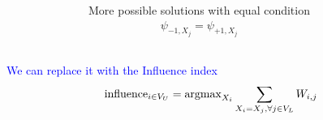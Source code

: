 \begin{frame}
\begin{columns}
\begin{figure}
		\end{figure}
		
		More possible solutions with equal condition
		\begin{align*}
		\psi_{-1, X_j} = \psi_{+1, X_j}
		\end{align*}
	\end{columns}
	
	\pause
	\vspace{.5cm}
	\textcolor{blue}{We can replace it with the Influence index}
	\begin{align*}
	\textnormal{influence}_{i \in V_U} = \operatorname{argmax}_{X_i}{ \sum_{X_i = X_j, \forall j \in V_L}{W_{i, j}} }
	\end{align*}
\end{frame}

